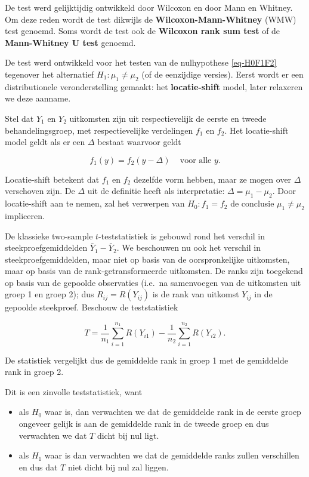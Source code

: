 \documentclass[
  dutch,
  letterpaper,
  12pt]{book}
\theoremstyle{definition}
\theoremstyle{definition}
\theoremstyle{definition}
\theoremstyle{remark}
\begin{document}
De test werd gelijktijdig ontwikkeld door Wilcoxon en door Mann en
Whitney. Om deze reden wordt de test dikwijls de
\textbf{Wilcoxon-Mann-Whitney} (WMW) test genoemd. Soms wordt de test
ook de \textbf{Wilcoxon rank sum test} of de \textbf{Mann-Whitney U
test} genoemd.

De test werd ontwikkeld voor het testen van de nulhypothese
\ref{eq-H0F1F2} tegenover het alternatief \(H_1: \mu_1\neq \mu_2\) (of
de eenzijdige versies). Eerst wordt er een distributionele
veronderstelling gemaakt: het \textbf{locatie-shift} model, later
relaxeren we deze aanname.

Stel dat \(Y_1\) en \(Y_2\) uitkomsten zijn uit respectievelijk de
eerste en tweede behandelingsgroep, met respectievelijke verdelingen
\(f_1\) en \(f_2\). Het locatie-shift model geldt als er een \(\Delta\)
bestaat waarvoor geldt

\[f_1(y)=f_2(y-\Delta) \;\;\;\text{ voor alle } y.\]

Locatie-shift betekent dat \(f_1\) en \(f_2\) dezelfde vorm hebben, maar
ze mogen over \(\Delta\) verschoven zijn. De \(\Delta\) uit de definitie
heeft als interpretatie: \(\Delta = \mu_1-\mu_2\). Door locatie-shift
aan te nemen, zal het verwerpen van \(H_0: f_1=f_2\) de conclusie
\(\mu_1\neq \mu_2\) impliceren.

De klassieke two-sample \(t\)-teststatistiek is gebouwd rond het
verschil in steekproefgemiddelden \(\bar{Y}_1-\bar{Y}_2\). We beschouwen
nu ook het verschil in steekproefgemiddelden, maar niet op basis van de
oorspronkelijke uitkomsten, maar op basis van de rank-getransformeerde
uitkomsten. De ranks zijn toegekend op basis van de gepoolde observaties
(i.e.~na samenvoegen van de uitkomsten uit groep 1 en groep 2); dus
\(R_{ij}=R(Y_{ij})\) is de rank van uitkomst \(Y_{ij}\) in de gepoolde
steekproef. Beschouw de teststatistiek

\[T = \frac{1}{n_1}\sum_{i=1}^{n_1} R(Y_{i1}) - \frac{1}{n_2}\sum_{i=1}^{n_2} R(Y_{i2}) .\]

De statistiek vergelijkt dus de gemiddelde rank in groep 1 met de
gemiddelde rank in groep 2.

Dit is een zinvolle teststatistiek, want

\begin{itemize}
\item
  als \(H_0\) waar is, dan verwachten we dat de gemiddelde rank in de
  eerste groep ongeveer gelijk is aan de gemiddelde rank in de tweede
  groep en dus verwachten we dat \(T\) dicht bij nul ligt.
\item
  als \(H_1\) waar is dan verwachten we dat de gemiddelde ranks zullen
  verschillen en dus dat \(T\) niet dicht bij nul zal liggen.
\end{itemize}
\end{document}
